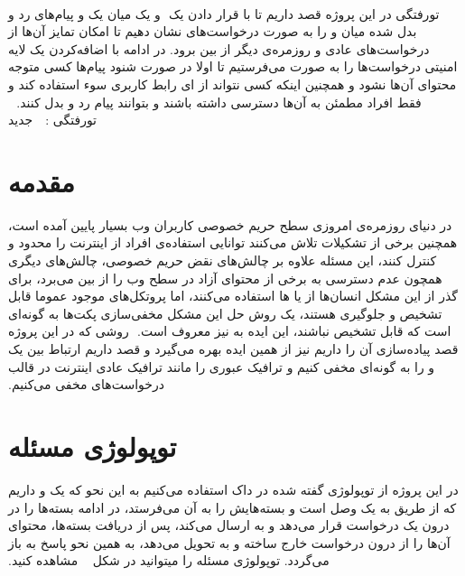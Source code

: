 ‫
‫%
‫%
‫%
\newif\iffigure
\figuretrue

‫
‫
‫
‫‌تورفتگی
‫در این پروژه قصد داریم تا با قرار دادن یک 
‫ و یک  میان یک  و  پیام‌های رد و بدل شده میان  و  را به صورت درخواست‌های  نشان دهیم تا امکان تمایز آن‌ها از درخواست‌های عادی و روزمره‌ی دیگر از بین برود. در ادامه با اضافه‌کردن یک لایه امنیتی درخواست‌ها را به صورت  می‌فرستیم تا اولا در صورت شنود پیام‌ها کسی متوجه محتوای آن‌ها نشود و همچنین اینکه کسی نتواند از ای رابط کاربری سوء استفاده کند و فقط افراد مطمئن به آن‌ها دسترسی داشته باشند و بتوانند پیام رد و بدل کنند.
‫
‫%
‌تورفتگی : 
‫%
‫
‫‌جدید
‫
‫\section{مقدمه}
‫
‫در دنیای روزمره‌ی امروزی سطح حریم خصوصی کاربران وب بسیار پایین آمده است، همچنین برخی از تشکیلات تلاش می‌کنند توانایی استفاده‌ی افراد از اینترنت را محدود و کنترل کنند، این مسئله علاوه بر چالش‌های نقض حریم خصوصی، چالش‌های دیگری همچون عدم دسترسی به برخی از محتوای آزاد در سطح وب را از بین می‌برد، برای گذر از این مشکل انسان‌ها از  یا ها استفاده می‌کنند، اما پروتکل‌های موجود عموما قابل تشخیص و جلوگیری هستند، یک روش حل این مشکل مخفی‌سازی پکت‌ها به گونه‌ای است که قابل تشخیص نباشند، این ایده به  نیز معروف است.
‫
‫روشی که در این پروژه قصد پیاده‌سازی آن را داریم نیز از همین ایده بهره می‌گیرد و قصد داریم ارتباط بین یک  و  را به گونه‌ای مخفی کنیم و ترافیک عبوری را مانند ترافیک عادی اینترنت در قالب درخواست‌های  مخفی می‌کنیم.
‫
‫\section{توپولوژی مسئله}
‫در این پروژه از توپولوژی گفته شده در داک استفاده می‌کنیم به این نحو که یک  و  داریم که  از طریق  به یک  وصل است و بسته‌هایش را به آن می‌فرستد،  در ادامه بسته‌ها را در درون یک درخواست  قرار می‌دهد و به  ارسال می‌کند،  پس از دریافت بسته‌ها، محتوای آن‌ها را از درون درخواست  خارج ساخته و به  تحویل می‌دهد، به همین نحو پاسخ  به  باز می‌گردد. توپولوژی مسئله را میتوانید در شکل ~ مشاهده کنید.
